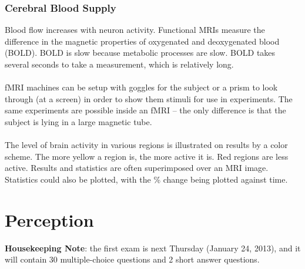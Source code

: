 \documentclass[]{article}
\newcommand{\lecture}[1]{\marginpar{{\footnotesize $\leftarrow$ \underline{#1}}}}
\begin{document}
			\subsubsection{Cerebral Blood Supply}
				Blood flow increases with neuron activity. Functional MRIs measure the difference in the magnetic properties of oxygenated and deoxygenated blood (BOLD). BOLD is slow because metabolic processes are slow. BOLD takes several seconds to take a measurement, which is relatively long.
				\\ \\
				fMRI machines can be setup with goggles for the subject or a prism to look through (at a screen) in order to show them stimuli for use in experiments. The same experiments are possible inside an fMRI -- the only difference is that the subject is lying in a large magnetic tube.
				\\ \\
				The level of brain activity in various regions is illustrated on results by a color scheme. The more yellow a region is, the more active it is. Red regions are less active. Results and statistics are often superimposed over an MRI image. Statistics could also be plotted, with the \% change being plotted against time.
	\section{Perception} \lecture{January 17, 2013}
		\textbf{Housekeeping Note}: the first exam is next Thursday (January 24, 2013), and it will contain 30 multiple-choice questions and 2 short answer questions.
		
\end{document}
